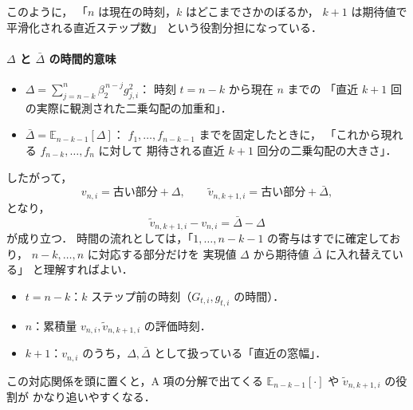 \documentclass[dvipdfmx,a4paper,11pt]{jsarticle}
\begin{document}
このように，
「$n$ は現在の時刻，$k$ はどこまでさかのぼるか，
 $k+1$ は期待値で平滑化される直近ステップ数」
という役割分担になっている．

\paragraph{$\Delta$ と $\bar{\Delta}$ の時間的意味}

\begin{itemize}
  \item $\Delta = \displaystyle\sum_{j=n-k}^{n} \beta_2^{\,n-j} g_{j,i}^2$：
    時刻 $t=n-k$ から現在 $n$ までの
    「直近 $k+1$ 回の実際に観測された二乗勾配の加重和」．
  \item $\bar{\Delta} = \mathbb{E}_{n-k-1}[\Delta]$：
    $f_1,\ldots,f_{n-k-1}$ までを固定したときに，
    「これから現れる $f_{n-k},\ldots,f_n$ に対して
      期待される直近 $k+1$ 回分の二乗勾配の大きさ」．
\end{itemize}

\noindent
したがって，
\[
  v_{n,i}
  = \text{古い部分} + \Delta, \qquad
  \tilde{v}_{n,k+1,i}
  = \text{古い部分} + \bar{\Delta},
\]
となり，
\[
  \tilde{v}_{n,k+1,i} - v_{n,i} = \bar{\Delta} - \Delta
\]
が成り立つ．
時間の流れとしては，「$1,\ldots,n-k-1$ の寄与はすでに確定しており，
   $n-k,\ldots,n$ に対応する部分だけを
   実現値 $\Delta$ から期待値 $\bar{\Delta}$ に入れ替えている」
と理解すればよい．

\begin{itemize}
  \item $t = n-k$：$k$ ステップ前の時刻（$G_{t,i}, g_{t,i}$ の時間）．
  \item $n$：累積量 $v_{n,i}, \tilde{v}_{n,k+1,i}$ の評価時刻．
  \item $k+1$：$v_{n,i}$ のうち，$\Delta,\bar{\Delta}$ として扱っている「直近の窓幅」．
\end{itemize}
この対応関係を頭に置くと，A 項の分解で出てくる
$\mathbb{E}_{n-k-1}[\cdot]$ や $\tilde{v}_{n,k+1,i}$ の役割が
かなり追いやすくなる．



\newpage
\end{document}

